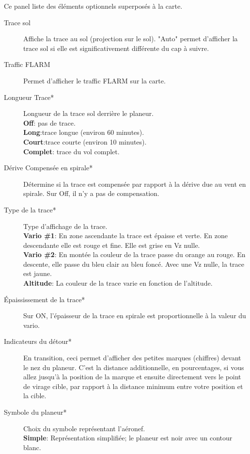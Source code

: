 Ce panel liste des éléments optionnels superposés à la carte.

\begin{description}
\item[Trace sol]  Affiche la trace au sol (projection sur le sol). "Auto" permet d'afficher la trace sol si elle est significativement différente du cap à suivre.
\item[Traffic FLARM]  \label{conf:flarm-on-map} Permet d'afficher le traffic FLARM sur la carte.
\item[Longueur Trace*] \label{conf:snailtrail} Longueur de la trace sol derrière le planeur.\\
  {\bf Off}: pas de trace. \\
  {\bf Long}:trace longue (environ 60 minutes). \\
  {\bf Court}:trace courte (environ 10 minutes). \\
  {\bf Complet}: trace du vol complet.
\item[Dérive Compensée en spirale*] \label{conf:traildrift} Détermine si la trace est compensée par rapport à la dérive due au vent en spirale. Sur Off, il n'y a pas de compensation.
\item[Type de la trace*] \label{conf:snailtype} Type d'affichage de la trace. \\
  {\bf Vario \#1}: En zone ascendante la trace est épaisse et verte. En zone descendante elle est rouge et fine. Elle est grise en Vz nulle.\\
  {\bf Vario \#2}: En montée la couleur de la trace passe du orange au rouge. En descente, elle passe du bleu clair au bleu foncé. Avec une Vz nulle, la trace est jaune.\\
  {\bf Altitude}: La couleur de la trace varie en fonction de l'altitude.
\item[Épaississement de la trace*] \label{conf:trailscaled} Sur ON, l'épaisseur de la trace en spirale est proportionnelle à la valeur du vario.
\item[Indicateurs du détour*]  En transition, ceci permet d'afficher des petites marques (chiffres) devant le nez du planeur. C'est la distance additionnelle, en pourcentages, si vous allez jusqu'à la position de la marque et ensuite directement vers le point de virage cible, par rapport à la distance minimum entre votre position et la cible.
\item[Symbole du planeur*]  Choix du symbole représentant l'aéronef. \\
  {\bf Simple}: Représentation simplifiée; le planeur est noir avec un contour blanc.\\

\end{description}
